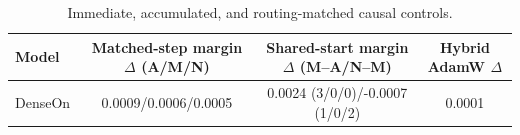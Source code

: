 \begin{table}[t]
\centering
\small
\begin{tabular}{lccc}
\toprule
Model & Matched-step margin $\Delta$ (A/M/N) & Shared-start margin $\Delta$ (M--A/N--M) & Hybrid AdamW $\Delta$ \\
\midrule
DenseOn & 0.0009/0.0006/0.0005 & 0.0024 (3/0/0)/-0.0007 (1/0/2) & 0.0001 \\
\bottomrule
\end{tabular}
\caption{Immediate, accumulated, and routing-matched causal controls.}
\label{tab:intervention-results}
\end{table}
